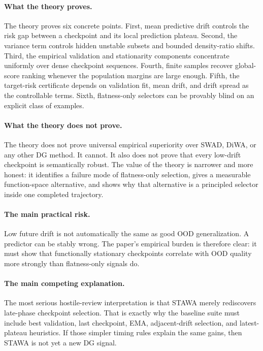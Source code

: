 \documentclass{article}
\newcommand{\ood}{OOD}
\newcommand{\stawa}{\textup{\textsc{STAWA}}}
\newcommand{\swad}{\textup{\textsc{SWAD}}}
\begin{document}
\paragraph{What the theory proves.}
The theory proves six concrete points. First, mean predictive drift controls the risk gap between a checkpoint and its local prediction plateau. Second, the variance term controls hidden unstable subsets and bounded density-ratio shifts. Third, the empirical validation and stationarity components concentrate uniformly over dense checkpoint sequences. Fourth, finite samples recover global-score ranking whenever the population margins are large enough. Fifth, the target-risk certificate depends on validation fit, mean drift, and drift spread as the controllable terms. Sixth, flatness-only selectors can be provably blind on an explicit class of examples.

\paragraph{What the theory does not prove.}
The theory does not prove universal empirical superiority over \swad{}, DiWA, or any other DG method. It cannot. It also does not prove that every low-drift checkpoint is semantically robust. The value of the theory is narrower and more honest: it identifies a failure mode of flatness-only selection, gives a measurable function-space alternative, and shows why that alternative is a principled selector inside one completed trajectory.

\paragraph{The main practical risk.}
Low future drift is not automatically the same as good \ood{} generalization. A predictor can be stably wrong. The paper's empirical burden is therefore clear: it must show that functionally stationary checkpoints correlate with \ood{} quality more strongly than flatness-only signals do.

\paragraph{The main competing explanation.}
The most serious hostile-review interpretation is that \stawa{} merely rediscovers late-phase checkpoint selection. That is exactly why the baseline suite must include best validation, last checkpoint, EMA, adjacent-drift selection, and latest-plateau heuristics. If those simpler timing rules explain the same gains, then \stawa{} is not yet a new DG signal.
\end{document}
